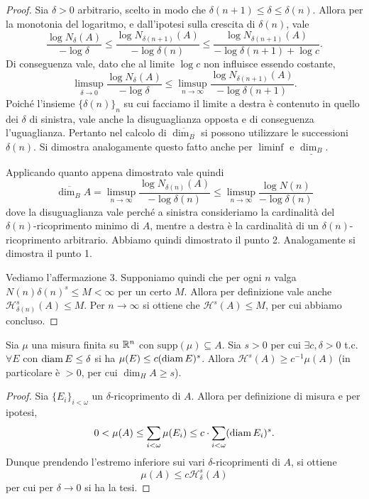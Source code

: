 \begin{proof}
	Sia $\delta>0$ arbitrario, scelto in modo che $\delta(n+1)\leq\delta\leq\delta(n)$. 
	Allora per la monotonia del logaritmo, e dall'ipotesi sulla crescita di $\delta(n)$, vale 
	$$\frac{\log N_{\delta}(A)}{-\log\delta} \leq \frac{\log N_{\delta(n+1)}(A)}{-\log\delta(n)} \leq \frac{\log N_{\delta(n+1)}(A)}{-\log\delta(n+1) + \log c}.$$
	Di conseguenza vale, dato che al limite $\log c$ non influisce essendo costante, 
	$$\limsup_{\delta\to0}\frac{\log N_{\delta}(A)}{-\log\delta} \leq \limsup_{n\to\infty}\frac{\log N_{\delta(n+1)}(A)}{-\log\delta(n+1)}.$$
	Poiché l'insieme $\{\delta(n)\}_{n}$ su cui facciamo il limite a destra è contenuto in quello dei $\delta$ di sinistra, vale anche la disuguaglianza opposta e di conseguenza l'uguaglianza. 
	Pertanto nel calcolo di $\overline{\dim_{B}}$ si possono utilizzare le successioni $\delta(n)$.
	Si dimostra analogamente questo fatto anche per $\liminf$ e $\underline{\dim_{B}}$.
	
	Applicando quanto appena dimostrato vale quindi 
	$$\overline{\dim_{B}}A = \limsup_{n\to\infty}\frac{\log N_{\delta(n)}(A)}{-\log\delta(n)} \leq \limsup_{n\to\infty}\frac{\log N(n)}{-\log\delta(n)}$$
	dove la disuguaglianza vale perché a sinistra consideriamo la cardinalità del $\delta(n)$-ricoprimento minimo di $A$, mentre a destra è la cardinalità di un $\delta(n)$-ricoprimento arbitrario.
	Abbiamo quindi dimostrato il punto 2. Analogamente si dimostra il punto 1. 
	
	Vediamo l'affermazione 3. 
	Supponiamo quindi che per ogni $n$ valga $N(n)\delta(n)^{s} \leq M < \infty$ per un certo $M$.
	Allora per definizione vale anche $\mathcal H_{\delta(n)}^{s}(A) \leq M$. Per $n\to\infty$ si ottiene che $\mathcal H^{s}(A)\leq M$, per cui abbiamo concluso. 	
\end{proof}

\begin{proposizione}
	Sia $\mu$ una misura finita su $\mathbb{R}^{n}$ con $\text{supp}(\mu)\subseteq A$. 
	Sia $s>0$ per cui $\exists c,\delta > 0$ t.c. $\forall E$ con $\operatorname{diam} E\leq \delta$ si ha $\mu(E)\leq c(\operatorname{diam} E)^{s}$. 
	Allora $\mathcal H^{s}(A) \geq c^{-1}\mu(A)$ (in particolare è $>0$, per cui $\dim_{H}A\geq s$).
\end{proposizione}
\begin{proof}
	Sia $\{E_{i}\}_{i<\omega}$ un $\delta$-ricoprimento di $A$. 
	Allora per definizione di misura e per ipotesi, 
	$$0<\mu(A)\leq \sum_{i<\omega}\mu (E_{i}) \leq c\cdot\sum_{i<\omega}(\operatorname{diam} E_{i})^{s}.$$
	Dunque prendendo l'estremo inferiore sui vari $\delta$-ricoprimenti di $A$, si ottiene 
	$$\mu(A) \leq c\mathcal H^{s}_{\delta}(A)$$
	per cui per $\delta\to0$ si ha la tesi.
\end{proof}

